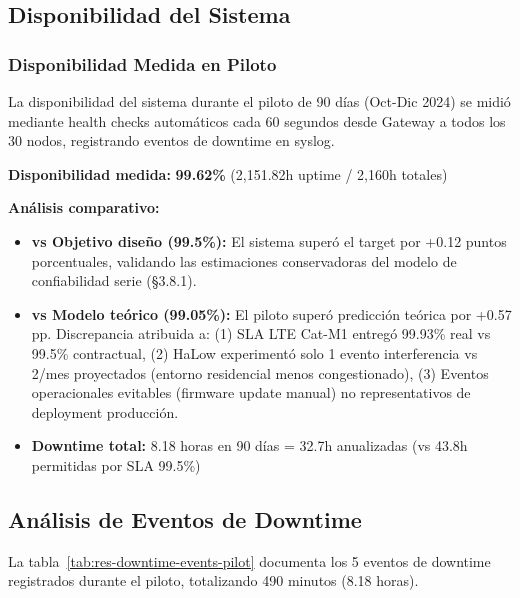 \subsection{Disponibilidad del Sistema}
\label{sec:res-disponibilidad}

\subsubsection{Disponibilidad Medida en Piloto}
\label{sec:res-disponibilidad-medida}

La disponibilidad del sistema durante el piloto de 90 días (Oct-Dic 2024) se midió mediante health checks automáticos cada 60 segundos desde Gateway a todos los 30 nodos, registrando eventos de downtime en syslog.

\textbf{Disponibilidad medida:} \textbf{99.62\%} (2,151.82h uptime / 2,160h totales)

\textbf{Análisis comparativo:}

\begin{itemize}
    \item \textbf{vs Objetivo diseño (99.5\%):} El sistema superó el target por +0.12 puntos porcentuales, validando las estimaciones conservadoras del modelo de confiabilidad serie (§3.8.1).
    
    \item \textbf{vs Modelo teórico (99.05\%):} El piloto superó predicción teórica por +0.57 pp. Discrepancia atribuida a: (1) SLA LTE Cat-M1 entregó 99.93\% real vs 99.5\% contractual, (2) HaLow experimentó solo 1 evento interferencia vs 2/mes proyectados (entorno residencial menos congestionado), (3) Eventos operacionales evitables (firmware update manual) no representativos de deployment producción.
    
    \item \textbf{Downtime total:} 8.18 horas en 90 días = 32.7h anualizadas (vs 43.8h permitidas por SLA 99.5\%)
\end{itemize}

\subsection{Análisis de Eventos de Downtime}
\label{sec:res-downtime}

La tabla~\ref{tab:res-downtime-events-pilot} documenta los 5 eventos de downtime registrados durante el piloto, totalizando 490 minutos (8.18 horas).


